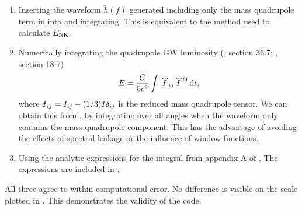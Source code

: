 \begin{enumerate}
\item Inserting the waveform $\widetilde{h}(f)$ generated including only the mass quadrupole term in  into  and integrating. This is equivalent to the method used to calculate $E_\mathrm{NK}$.
\item Numerically integrating the quadrupole GW luminosity (\citealt{Misner1973}, section 36.7; \citealt{Hobson2006}, section 18.7)
\begin{equation}
E = \dfrac{G}{5c^9}\intd{}{}{\dddot{\Ibar}_{ij}\dddot{\Ibar}^{ij}}{t},
\label{eq:E_quad}
\end{equation}
where $\Ibar_{ij} = I_{ij} - (1/3)I\delta_{ij}$ is the reduced mass quadrupole tensor. We can obtain this from , by integrating over all angles when the waveform only contains the mass quadrupole component. This has the advantage of avoiding the effects of spectral leakage or the influence of window functions.
\item Using the analytic expressions for the integral  from appendix A of \citet{Gair2005}. The expressions are included in .
\end{enumerate}
All three agree to within computational error. No difference is visible on the scale plotted in . This demonstrates the validity of the code.

